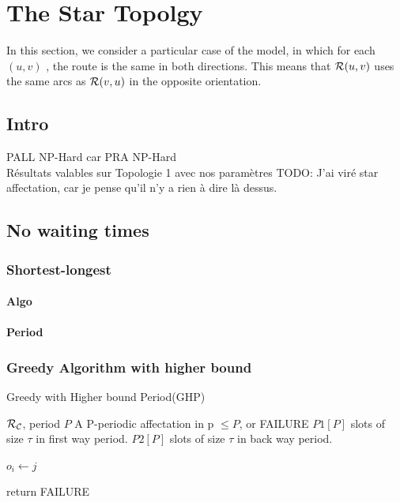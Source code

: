 \documentclass[a4paper,10pt]{article}
\newcommand{\todo}[1]{{\color{red} TODO: {#1}}}
\begin{document}
\section{The Star Topolgy}
  
  In this section, we consider a particular case of the model, in which for each $(u,v)$ , the route is the same in both directions. This means that ${\cal R}(u,v)$ uses the same arcs as ${\cal R}(v,u)$ in the opposite orientation.
  \subsection{Intro}
    PALL NP-Hard car PRA NP-Hard\\
    Résultats valables sur Topologie 1 avec nos paramètres
    \todo{J'ai viré star affectation, car je pense qu'il n'y a rien à dire là dessus.}
    
  \subsection{No waiting times}
    \subsubsection{Shortest-longest}
      \paragraph{Algo}
      \paragraph{Period}
    \subsubsection{Greedy Algorithm with higher bound}
   
	\begin{algorithm}[H]
	\caption{Greedy with Higher bound Period(GHP)}
	\begin{algorithmic}
	\REQUIRE ${\cal R}_{\cal C}$, period $P$
	\ENSURE A P-periodic affectation in p $\leq P$, or FAILURE
	\STATE $P1[P]$ slots of size $\tau$ in first way period.
	\STATE $P2[P]$ slots  of size $\tau$ in back way period.



	
	\STATE $o_i \leftarrow j$
	\ENDIF


	\STATE return FAILURE
	\ENDIF
	\ENDFOR

	\ENDFOR

	\end{algorithmic}
	\end{algorithm}
\end{document}
